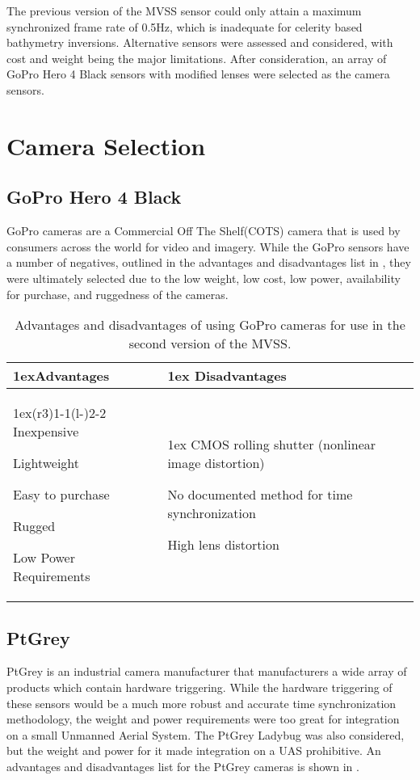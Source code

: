 	The previous version of the MVSS sensor could only attain a maximum synchronized frame rate of 0.5Hz, which is inadequate for celerity based bathymetry inversions.  Alternative sensors were assessed and considered, with cost and weight being the major limitations.  After consideration, an array of GoPro Hero 4 Black sensors with modified lenses were selected as the camera sensors. 
	\section{Camera Selection}
	\subsection{GoPro Hero 4 Black}
	GoPro cameras are a Commercial Off The Shelf(COTS) camera that is used by consumers across the world for video and imagery.  While the GoPro sensors have a number of negatives, outlined in the advantages and disadvantages list in , they were ultimately selected due to the low weight, low cost, low power, availability for purchase, and ruggedness of the cameras.
	
	\begin{table}[H]
		\begin{tabularx}{\linewidth}{>{\parskip1ex}X@{\kern4\tabcolsep}>{\parskip1ex}X}
			\toprule
			\hfil\bfseries Advantages
			&
			\hfil\bfseries Disadvantages
			\\\cmidrule(r{3\tabcolsep}){1-1}\cmidrule(l{-\tabcolsep}){2-2}
			Inexpensive\par
			Lightweight\par
			Easy to purchase\par
			Rugged\par
			Low Power Requirements
			&
			CMOS rolling shutter (nonlinear image distortion)\par
			No documented method for time synchronization\par
			High lens distortion 
			\\\bottomrule
		\end{tabularx}
		\caption{Advantages and disadvantages of using GoPro cameras for use in the second version of the MVSS.}
		\label{tab:gopro}
	\end{table}
	
	\subsection{PtGrey}
	PtGrey is an industrial camera manufacturer that manufacturers a wide array of products which contain hardware triggering.  While the hardware triggering of these sensors would be a much more robust and accurate time synchronization methodology, the weight and power requirements were too great for integration on a small Unmanned Aerial System.  The PtGrey Ladybug was also considered, but the weight and power for it made integration on a UAS prohibitive. An advantages and disadvantages list for the PtGrey cameras is shown in .
	
